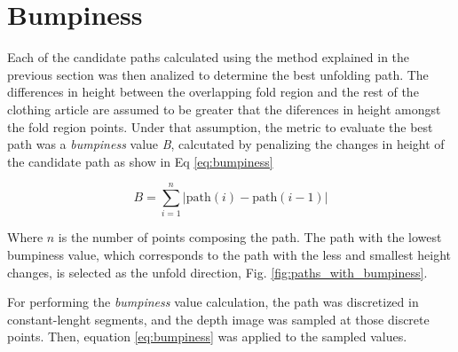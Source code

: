 \section{Bumpiness}
\label{bumpiness}

Each of the candidate paths calculated using the method explained in the previous section was then analized to determine the best unfolding path. The differences in height between the overlapping fold region and the rest of the clothing article are assumed to be greater that the diferences in height amongst the fold region points. Under that assumption, the metric to evaluate the best path was a \textit{bumpiness} value \textit{B}, calcutated by penalizing the changes in height of the candidate path as show in Eq \ref{eq:bumpiness}

\begin{equation}\label{eq:bumpiness}
B = \sum_{i=1}^{n} | \textrm{path}(i)- \textrm{path}(i-1) | 
\end{equation}

Where $n$ is the number of points composing the path. The path with the lowest bumpiness value, which corresponds to the path with the less and smallest height changes, is selected as the unfold direction, Fig. \ref{fig:paths_with_bumpiness}.

For performing the \textit{bumpiness} value calculation, the path was discretized  in constant-lenght segments, and the depth image was sampled at those discrete points. Then, equation \ref{eq:bumpiness} was applied to the sampled values.

